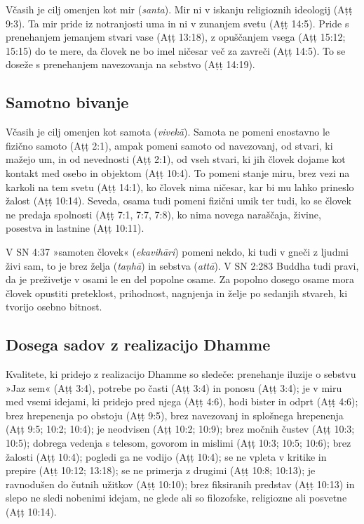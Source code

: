 Včasih je cilj omenjen kot mir
(\emph{santa}). Mir ni v iskanju religioznih ideologij (Aṭṭ 9:3). Ta mir
pride iz notranjosti uma in ni v zunanjem svetu (Aṭṭ 14:5). Pride s
prenehanjem jemanjem stvari vase (Aṭṭ 13:18), z opuščanjem vsega (Aṭṭ
15:12; 15:15) do te mere, da človek ne bo imel ničesar več za zavreči
(Aṭṭ 14:5). To se doseže s prenehanjem navezovanja na sebstvo (Aṭṭ
14:19).

\subsection{Samotno bivanje}

Včasih je cilj omenjen kot samota
(\emph{vivekā}). Samota ne pomeni enostavno le fizično samoto (Aṭṭ 2:1),
ampak pomeni samoto od navezovanj, od stvari, ki mažejo um, in od
nevednosti (Aṭṭ 2:1), od vseh stvari, ki jih človek dojame kot kontakt
med osebo in objektom (Aṭṭ 10:4). To pomeni stanje miru, brez vezi na
karkoli na tem svetu (Aṭṭ 14:1), ko človek nima ničesar, kar bi mu lahko
prineslo žalost (Aṭṭ 10:14). Seveda, osama tudi pomeni fizični umik ter
tudi, ko se človek ne predaja spolnosti (Aṭṭ 7:1, 7:7, 7:8), ko nima
novega naraščaja, živine, posestva in lastnine (Aṭṭ 10:11).

V SN 4:37 »samoten človek« (\emph{ekavihāri}) pomeni nekdo, ki tudi v
gneči z ljudmi živi sam, to je brez želja (\emph{taṇhā}) in sebstva
(\emph{attā}). V SN 2:283 Buddha tudi pravi, da je preživetje v osami le
en del popolne osame. Za popolno dosego osame mora človek opustiti
preteklost, prihodnost, nagnjenja in želje po sedanjih stvareh, ki
tvorijo osebno bitnost.

\subsection{Dosega sadov z realizacijo Dhamme}

Kvalitete, ki pridejo
z realizacijo Dhamme so sledeče: prenehanje iluzije o sebstvu »Jaz sem«
(Aṭṭ 3:4), potrebe po časti (Aṭṭ 3:4) in ponosu (Aṭṭ 3:4); je v miru med
vsemi idejami, ki pridejo pred njega (Aṭṭ 4:6), hodi bister in odprt
(Aṭṭ 4:6); brez hrepenenja po obstoju (Aṭṭ 9:5), brez navezovanj in
splošnega hrepenenja (Aṭṭ 9:5; 10:2; 10:4); je neodvisen (Aṭṭ 10:2;
10:9); brez močnih čustev (Aṭṭ 10:3; 10:5); dobrega vedenja s telesom,
govorom in mislimi (Aṭṭ 10:3; 10:5; 10:6); brez žalosti (Aṭṭ 10:4);
pogledi ga ne vodijo (Aṭṭ 10:4); se ne vpleta v kritike in prepire (Aṭṭ
10:12; 13:18); se ne primerja z drugimi (Aṭṭ 10:8; 10:13); je ravnodušen
do čutnih užitkov (Aṭṭ 10:10); brez fiksiranih predstav (Aṭṭ 10:13) in
slepo ne sledi nobenimi idejam, ne glede ali so filozofske, religiozne
ali posvetne (Aṭṭ 10:14).

